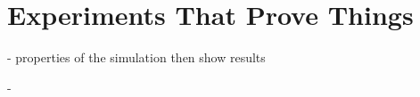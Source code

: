 
\def\chapdir{./ChapterExperiments}

\chapter{Experiments That Prove Things}\label{ch:experiments}
- properties of the simulation then show results









- 

